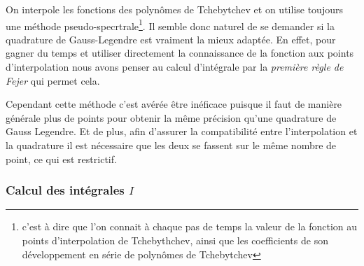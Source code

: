 \documentclass[10pt]{article}
\begin{document}
\begin{multicols}{2}
On interpole les fonctions des polynômes de Tchebytchev et on utilise toujours une méthode pseudo-specrtrale\footnote{c'est à dire que l'on connait à chaque pas de temps la valeur de la fonction au points d'interpolation de Tchebythchev, ainsi que les coefficients de son développement en série de polynômes de Tchebytchev}. Il semble donc naturel de se demander si la quadrature de Gauss-Legendre est vraiment la mieux adaptée. En effet, pour gagner du temps et utiliser directement la connaissance de la fonction aux points d'interpolation nous avons penser au calcul d'intégrale par la \emph{première règle de Fejer} \cite{} qui permet cela.
 
Cependant cette méthode c'est avérée être inéficace puisque il faut de manière générale plus de points pour obtenir la même précision qu'une quadrature de Gauss Legendre. Et de plus, afin d'assurer la compatibilité entre l'interpolation et la quadrature il est nécessaire que les deux se fassent sur le même nombre de point, ce qui est restrictif. 






\subsubsection{Calcul des intégrales $I$}


\end{multicols}
\end{document}
